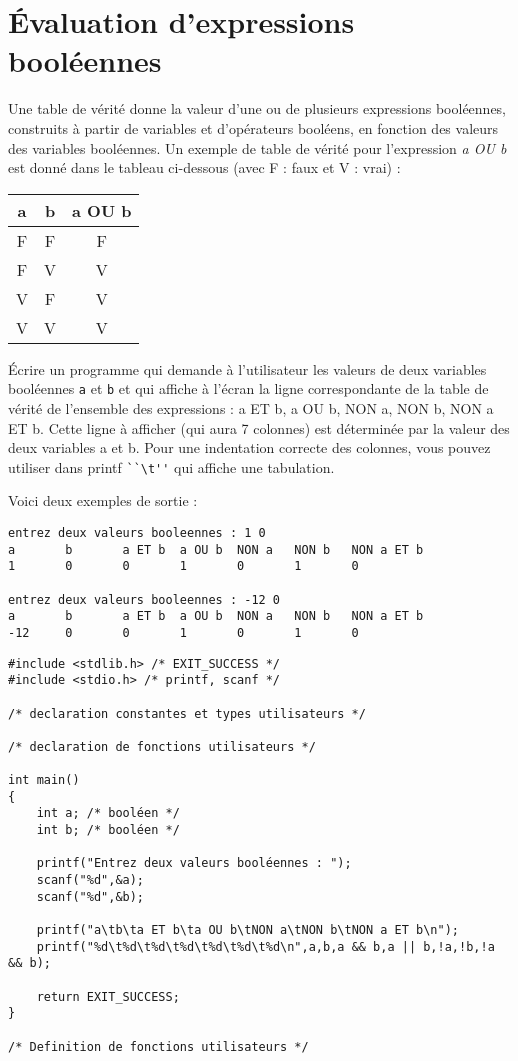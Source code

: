 \section{Évaluation d'expressions booléennes}
\label{sec:exo2}

Une table de vérité donne la valeur d'une ou de plusieurs expressions
booléennes, construits à partir de variables et d'opérateurs booléens,
en fonction des valeurs des variables booléennes. Un exemple de table
de vérité pour l'expression \textit{a OU b} est donné dans le tableau
ci-dessous (avec F : faux et V : vrai) :

\begin{center}

\begin{tabular}[h]{|c|c|c|}
\hline
a & b & a OU b\\
\hline
F & F & F\\
\hline
F & V & V\\
\hline
V & F & V\\
\hline
V & V & V\\
\hline
\end{tabular}
\end{center}

Écrire un programme qui demande à l'utilisateur les valeurs de deux variables booléennes \verb|a| et \verb|b| et qui affiche
à l'écran la ligne correspondante de la table de vérité de l'ensemble des
expressions : a ET b, a OU b, NON a, NON b, NON a ET b. Cette ligne à
afficher (qui aura 7 colonnes) est déterminée par la valeur des deux
variables a et b. Pour une indentation correcte des colonnes, vous pouvez utiliser dans printf
  \verb|``\t''| qui affiche une tabulation.

Voici deux exemples de sortie :
\begin{verbatim}
entrez deux valeurs booleennes : 1 0
a       b       a ET b  a OU b  NON a   NON b   NON a ET b
1       0       0       1       0       1       0

entrez deux valeurs booleennes : -12 0
a       b       a ET b  a OU b  NON a   NON b   NON a ET b
-12     0       0       1       0       1       0
\end{verbatim}

\begin{correction}
\begin{verbatim}
#include <stdlib.h> /* EXIT_SUCCESS */
#include <stdio.h> /* printf, scanf */

/* declaration constantes et types utilisateurs */

/* declaration de fonctions utilisateurs */

int main()
{
    int a; /* booléen */
    int b; /* booléen */

    printf("Entrez deux valeurs booléennes : ");
    scanf("%d",&a);
    scanf("%d",&b);

    printf("a\tb\ta ET b\ta OU b\tNON a\tNON b\tNON a ET b\n");
    printf("%d\t%d\t%d\t%d\t%d\t%d\t%d\n",a,b,a && b,a || b,!a,!b,!a && b);

    return EXIT_SUCCESS;
}

/* Definition de fonctions utilisateurs */
\end{verbatim}
\end{correction}

